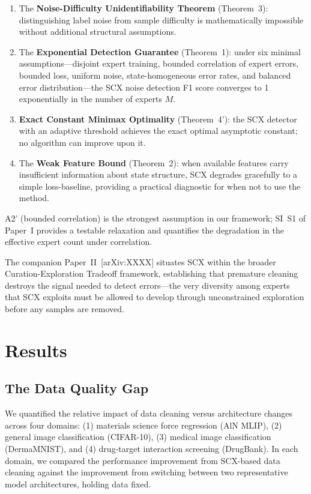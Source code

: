 \begin{enumerate}
    \item The \textbf{Noise-Difficulty Unidentifiability Theorem} (Theorem~3): distinguishing label noise from sample difficulty is mathematically impossible without additional structural assumptions.
    \item The \textbf{Exponential Detection Guarantee} (Theorem~1): under six minimal assumptions---disjoint expert training, bounded correlation of expert errors, bounded loss, uniform noise, state-homogeneous error rates, and balanced error distribution---the SCX noise detection F1 score converges to 1 exponentially in the number of experts $M$.
    \item \textbf{Exact Constant Minimax Optimality} (Theorem~4'): the SCX detector with an adaptive threshold achieves the exact optimal asymptotic constant; no algorithm can improve upon it.
    \item The \textbf{Weak Feature Bound} (Theorem~2): when available features carry insufficient information about state structure, SCX degrades gracefully to a simple loss-baseline, providing a practical diagnostic for when not to use the method.
\end{enumerate}

A2' (bounded correlation) is the strongest assumption in our framework; SI~S1 of Paper~I provides a testable relaxation and quantifies the degradation in the effective expert count under correlation.

The companion Paper~II~[arXiv:XXXX] situates SCX within the broader Curation-Exploration Tradeoff framework, establishing that premature cleaning destroys the signal needed to detect errors---the very diversity among experts that SCX exploits must be allowed to develop through unconstrained exploration before any samples are removed.

\section{Results}

\subsection{The Data Quality Gap}

We quantified the relative impact of data cleaning versus architecture changes across four domains: (1) materials science force regression (AlN MLIP), (2) general image classification (CIFAR-10), (3) medical image classification (DermaMNIST), and (4) drug-target interaction screening (DrugBank). In each domain, we compared the performance improvement from SCX-based data cleaning against the improvement from switching between two representative model architectures, holding data fixed.

